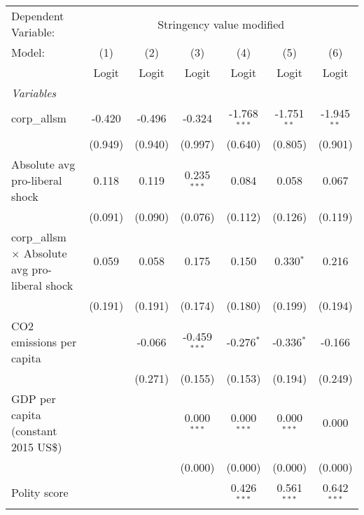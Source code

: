 
\begingroup
\centering
\begin{tabular}{lcccccc}
   \toprule
   Dependent Variable: & \multicolumn{6}{c}{Stringency value modified}\\
   Model:                                                & (1)     & (2)     & (3)            & (4)            & (5)           & (6)\\  
                                                         &  Logit  & Logit   & Logit          & Logit          & Logit         & Logit\\  
   \midrule
   \emph{Variables}\\
   corp\_allsm                                           & -0.420  & -0.496  & -0.324         & -1.768$^{***}$ & -1.751$^{**}$ & -1.945$^{**}$\\   
                                                         & (0.949) & (0.940) & (0.997)        & (0.640)        & (0.805)       & (0.901)\\   
   Absolute avg pro-liberal shock                        & 0.118   & 0.119   & 0.235$^{***}$  & 0.084          & 0.058         & 0.067\\   
                                                         & (0.091) & (0.090) & (0.076)        & (0.112)        & (0.126)       & (0.119)\\   
   corp\_allsm $\times$ Absolute avg pro-liberal shock   & 0.059   & 0.058   & 0.175          & 0.150          & 0.330$^{*}$   & 0.216\\   
                                                         & (0.191) & (0.191) & (0.174)        & (0.180)        & (0.199)       & (0.194)\\   
   CO2 emissions per capita                              &         & -0.066  & -0.459$^{***}$ & -0.276$^{*}$   & -0.336$^{*}$  & -0.166\\   
                                                         &         & (0.271) & (0.155)        & (0.153)        & (0.194)       & (0.249)\\   
   GDP per capita (constant 2015 US\$)                   &         &         & 0.000$^{***}$  & 0.000$^{***}$  & 0.000$^{***}$ & 0.000\\   
                                                         &         &         & (0.000)        & (0.000)        & (0.000)       & (0.000)\\   
   Polity score                                          &         &         &                & 0.426$^{***}$  & 0.561$^{***}$ & 0.642$^{***}$\\   

\end{tabular}
